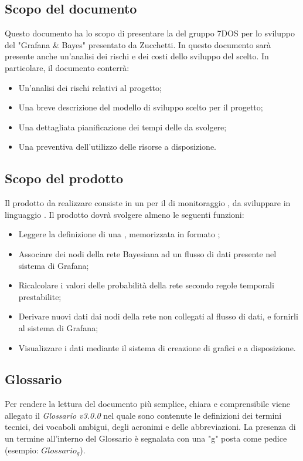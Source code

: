 \subsection{Scopo del documento}
Questo documento ha lo scopo di presentare la  del gruppo 7DOS per lo sviluppo del  "Grafana \& Bayes" presentato da Zucchetti. In questo documento sarà presente anche un'analisi dei rischi e dei costi dello sviluppo del  scelto.
In particolare, il documento conterrà:
\begin{itemize}
	\item Un'analisi dei rischi relativi al progetto;
	\item Una breve descrizione del modello di sviluppo scelto per il progetto;
	\item Una dettagliata pianificazione dei tempi delle  da svolgere;
	\item Una  preventiva dell'utilizzo delle risorse a disposizione.
\end{itemize}

\subsection{Scopo del prodotto}
Il prodotto da realizzare consiste in un  per il  di monitoraggio , da sviluppare in linguaggio . Il prodotto dovrà svolgere almeno le seguenti funzioni:
\begin{itemize}
	\item{Leggere la definizione di una , memorizzata in formato ;}
	\item{Associare dei nodi della rete Bayesiana ad un flusso di dati presente nel sistema di Grafana;}
	\item{Ricalcolare i valori delle probabilità della rete secondo regole temporali prestabilite;}
	\item{Derivare nuovi dati dai nodi della rete non collegati al flusso di dati, e fornirli al sistema di Grafana;}
	\item{Visualizzare i dati mediante il sistema di creazione di grafici e  a disposizione.}
\end{itemize}

\subsection{Glossario}
Per rendere la lettura del documento più semplice, chiara e comprensibile viene allegato il \emph{Glossario v3.0.0} nel quale sono contenute le definizioni dei termini tecnici, dei vocaboli ambigui, degli acronimi e delle abbreviazioni. La presenza di un termine all'interno del Glossario è segnalata con una "g" posta come pedice (esempio: $Glossario_{g}$).
